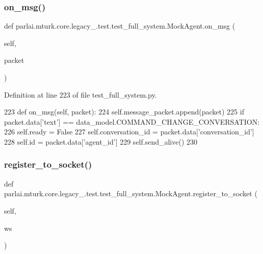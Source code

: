 \subsubsection{\texorpdfstring{on\+\_\+msg()}{on\_msg()}}
{\footnotesize\ttfamily def parlai.\+mturk.\+core.\+legacy\+\_.\+test.\+test\+\_\+full\+\_\+system.\+Mock\+Agent.\+on\+\_\+msg (\begin{DoxyParamCaption}\item[{}]{self,  }\item[{}]{packet }\end{DoxyParamCaption})}



Definition at line 223 of file test\+\_\+full\+\_\+system.\+py.


\begin{DoxyCode}
223     \textcolor{keyword}{def }on\_msg(self, packet):
224         self.message\_packet.append(packet)
225         \textcolor{keywordflow}{if} packet.data[\textcolor{stringliteral}{'text'}] == data\_model.COMMAND\_CHANGE\_CONVERSATION:
226             self.ready = \textcolor{keyword}{False}
227             self.conversation\_id = packet.data[\textcolor{stringliteral}{'conversation\_id'}]
228             self.id = packet.data[\textcolor{stringliteral}{'agent\_id'}]
229             self.send\_alive()
230 
\end{DoxyCode}
\mbox{\label{classparlai_1_1mturk_1_1core_1_1legacy__2018_1_1test_1_1test__full__system_1_1MockAgent_ad7789e7557ac736ec45b43854c998d57}} 
\subsubsection{\texorpdfstring{register\+\_\+to\+\_\+socket()}{register\_to\_socket()}}
{\footnotesize\ttfamily def parlai.\+mturk.\+core.\+legacy\+\_.\+test.\+test\+\_\+full\+\_\+system.\+Mock\+Agent.\+register\+\_\+to\+\_\+socket (\begin{DoxyParamCaption}\item[{}]{self,  }\item[{}]{ws }\end{DoxyParamCaption})}



